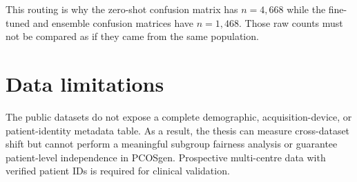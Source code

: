 \documentclass[../preamble.tex]{subfiles}
\begin{document}
This routing is why the zero-shot confusion matrix has $n=4{,}668$ while the
fine-tuned and ensemble confusion matrices have $n=1{,}468$. Those raw counts
must not be compared as if they came from the same population.

\section{Data limitations}
\label{sec:data-limitations}

The public datasets do not expose a complete demographic, acquisition-device,
or patient-identity metadata table. As a result, the thesis can measure
cross-dataset shift but cannot perform a meaningful subgroup fairness analysis
or guarantee patient-level independence in PCOSgen. Prospective multi-centre
data with verified patient IDs is required for clinical validation.
\end{document}
